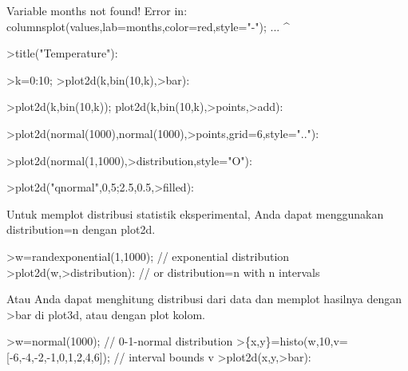 \documentclass[a4paper,10pt]{article}
\begin{document}
\begin{eulernotebook}
\begin{eulercomment}
\begin{eulercomment}
\begin{eulercomment}
\begin{eulercomment}
\begin{eulercomment}
\begin{eulercomment}
\begin{eulercomment}
\begin{eulercomment}
\begin{eulercomment}
\begin{eulercomment}
\begin{euleroutput}
  Variable months not found!
  Error in:
  columnsplot(values,lab=months,color=red,style="-"); ...
                               ^
\end{euleroutput}
\begin{eulerprompt}
>title("Temperature"):
\end{eulerprompt}
\begin{eulerprompt}
>k=0:10;
>plot2d(k,bin(10,k),>bar):
\end{eulerprompt}
\begin{eulerprompt}
>plot2d(k,bin(10,k)); plot2d(k,bin(10,k),>points,>add):
\end{eulerprompt}
\begin{eulerprompt}
>plot2d(normal(1000),normal(1000),>points,grid=6,style=".."):
\end{eulerprompt}
\begin{eulerprompt}
>plot2d(normal(1,1000),>distribution,style="O"):
\end{eulerprompt}
\begin{eulerprompt}
>plot2d("qnormal",0,5;2.5,0.5,>filled):
\end{eulerprompt}
\begin{eulercomment}
Untuk memplot distribusi statistik eksperimental, Anda dapat
menggunakan distribution=n dengan plot2d.
\end{eulercomment}
\begin{eulerprompt}
>w=randexponential(1,1000); // exponential distribution
>plot2d(w,>distribution): // or distribution=n with n intervals
\end{eulerprompt}
\begin{eulercomment}
Atau Anda dapat menghitung distribusi dari data dan memplot hasilnya
dengan \textgreater{}bar di plot3d, atau dengan plot kolom.
\end{eulercomment}
\begin{eulerprompt}
>w=normal(1000); // 0-1-normal distribution
>\{x,y\}=histo(w,10,v=[-6,-4,-2,-1,0,1,2,4,6]); // interval bounds v
>plot2d(x,y,>bar):
\end{eulerprompt}

\end{eulercomment}
\end{eulercomment}
\end{eulercomment}
\end{eulercomment}
\end{eulercomment}
\end{eulercomment}
\end{eulercomment}
\end{eulercomment}
\end{eulercomment}
\end{eulercomment}
\end{eulernotebook}
\end{document}

